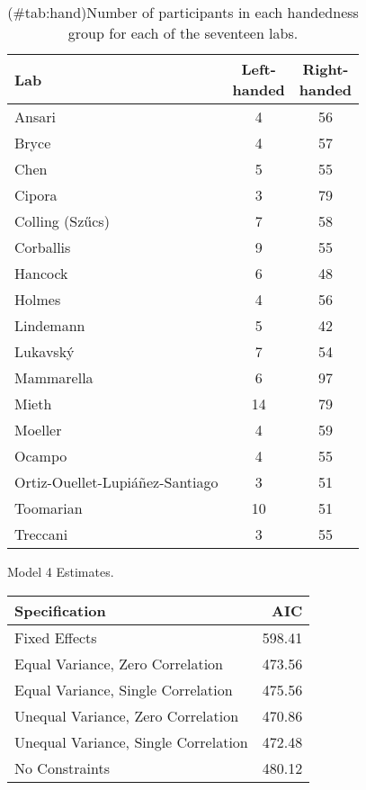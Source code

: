 \begin{appendix}
\begin{table}
\caption{(\#tab:hand)Number of participants in each handedness group for each of the seventeen labs.}
\centering
\begin{tabular}[t]{lcc}
\toprule
Lab & \makecell[c]{Left-\\handed} & \makecell[c]{Right-\\handed}\\
\midrule
Ansari & 4 & 56\\
Bryce & 4 & 57\\
Chen & 5 & 55\\
Cipora & 3 & 79\\
Colling (Szűcs) & 7 & 58\\
Corballis & 9 & 55\\
Hancock & 6 & 48\\
Holmes & 4 & 56\\
Lindemann & 5 & 42\\
Lukavský & 7 & 54\\
Mammarella & 6 & 97\\
Mieth & 14 & 79\\
Moeller & 4 & 59\\
Ocampo & 4 & 55\\
Ortiz-Ouellet-Lupiáñez-Santiago & 3 & 51\\
Toomarian & 10 & 51\\
Treccani & 3 & 55\\
\bottomrule
\end{tabular}
\end{table}

\begin{table}[!p]
\caption{\label{tab:mod4}Model 4 Estimates.}
\begin{subtable}{\textwidth}
\centering
\begin{table}[H]\centering\begingroup\fontsize{10}{12}\selectfont

\begin{tabular}{lr}
\toprule
Specification & AIC\\
\midrule
Fixed Effects & 598.41\\
Equal Variance, Zero Correlation & 473.56\\
Equal Variance, Single Correlation & 475.56\\
Unequal Variance, Zero Correlation & 470.86\\
Unequal Variance, Single Correlation & 472.48\\
No Constraints & 480.12\\
\bottomrule
\end{tabular}\endgroup{}
\end{table}
\end{subtable}
\begin{subtable}{\textwidth}
\caption{Fixed Effect Estimates}
\centering
\begin{table}[H]\centering\begingroup\fontsize{10}{12}\selectfont


\end{table}
\end{subtable}
\end{table}
\end{appendix}
